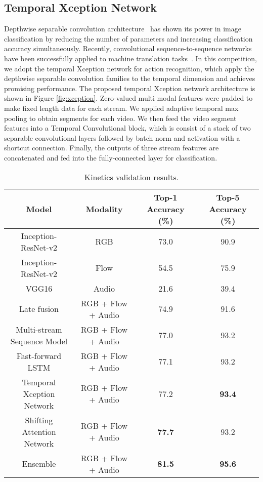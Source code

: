 \documentclass[10pt,twocolumn,letterpaper]{article}
\begin{document}
\subsection{Temporal Xception Network}
Depthwise separable convolution architecture~\cite{chollet2016xception,xie2016aggregated} has shown its power in image classification by reducing the number of parameters and increasing classification accuracy simultaneously. Recently, convolutional sequence-to-sequence networks have been successfully applied to machine translation tasks~\cite{gehring2017convolutional,kaiser2017depthwise}. In this competition, we adopt the temporal Xception network for action recognition, which apply the depthwise separable convolution families to the temporal dimension and achieves promising performance.
The proposed temporal Xception network architecture is shown in Figure \ref{fig:xception}. Zero-valued multi modal features were padded to make fixed length data for each stream. We applied adaptive temporal max pooling to obtain  segments for each video. We then feed the video segment features into a Temporal Convolutional block, which is consist of a stack of two separable convolutional layers followed by batch norm and activation with a shortcut connection. Finally, the outputs of three stream features are concatenated and fed into the fully-connected layer for classification.

\begin{table*}[t]
  \centering
  \begin{tabular}{c|c|c|c}
  \hline
  \hline
  Model & Modality & Top-1 Accuracy (\%) & Top-5 Accuracy (\%)\\
  \hline
   Inception-ResNet-v2&RGB & 73.0 & 90.9 \\
  \hline
    Inception-ResNet-v2& Flow & 54.5 & 75.9 \\
  \hline
    VGG16& Audio & 21.6 & 39.4 \\
     \hline
    Late fusion & RGB + Flow + Audio & 74.9 & 91.6 \\
  \hline
  \hline
  Multi-stream Sequence Model &RGB + Flow + Audio & 77.0 & 93.2 \\
  \hline
  Fast-forward LSTM &RGB + Flow + Audio & 77.1 & 93.2 \\
  \hline
  Temporal Xception Network &RGB + Flow + Audio& 77.2 & \textbf{93.4} \\
  \hline
  Shifting Attention Network & RGB + Flow + Audio& \textbf{77.7} & 93.2 \\
  \hline
    \hline
  Ensemble & RGB + Flow + Audio & \textbf{81.5} & \textbf{95.6} \\
  \hline
  \hline
  \end{tabular}
  \caption{Kinetics validation results.}
  \label{table:result}
\end{table*}
\end{document}
